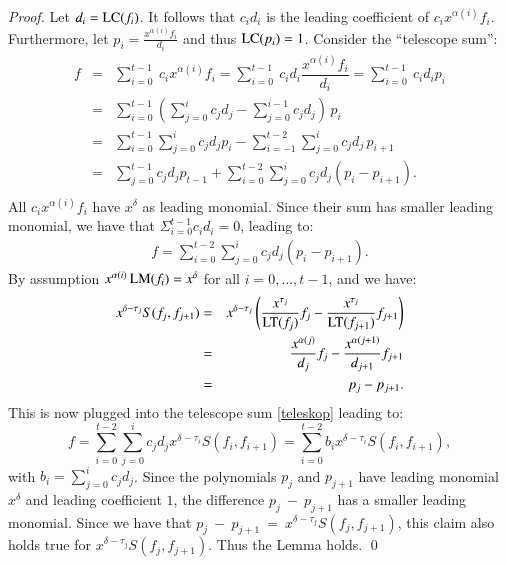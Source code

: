 \begin{proof}
Let $d_i = \textsc{LC}(f_i)$. It follows that $c_id_i$ is the leading coefficient of $c_ix^{\alpha(i)}f_i$.  Furthermore, let $p_i = \frac{x^{\alpha(i)}f_i}{d_i}$ and thus $\textsc{LC}(p_i) = 1$. Consider the ``telescope sum'':
\begin{eqnarray*}
f &=&\sum^{t-1}_{i=0} \ c_ix^{\alpha(i)}f_i=\sum^{t-1}_{i=0}\ c_i d_i\dfrac{x^{\alpha(i)}f_i}{d_i}=\sum^{t-1}_{i=0}\ c_id_ip_i\\
&=&\sum^{t-1}_{i=0}\left( \sum_{j=0}^{i}c_{j}d_{j} - \sum_{j=0}^{i-1}c_{j}d_{j} \right)\, p_{i}\\
&=&\sum^{t-1}_{i=0} \sum_{j=0}^{i}c_{j}d_{j}p_{i} -\sum^{t-2}_{i=-1} \sum_{j=0}^{i}c_{j}d_{j} \, p_{i+1}\\
&=&\sum_{j=0}^{t-1}c_{j}d_{j}p_{t-1}+\sum^{t-2}_{i=0} \sum_{j=0}^{i}c_{j}d_{j}(p_{i} - p_{i+1}).\\
\end{eqnarray*}
All $c_ix^{\alpha(i)}f_i$ have $x^\delta$ as leading monomial. Since their sum has smaller leading monomial, we have that 
$\Sigma^{t-1}_{i=0}c_id_i = 0$, leading to:
\begin{eqnarray} \label{teleskop}
f = \sum^{t-2}_{i=0} \sum_{j=0}^{i}c_{j}d_{j}(p_{i} - p_{i+1}).
\end{eqnarray}
By assumption  \(x^{\alpha(i)}\,\textsc{LM}(f_{i})=x^{\delta}\) for all \(i=0,\ldots,t-1\), and we have:
\begin{eqnarray*}
x^{\delta - \tau_{j}}S(f_j,f_{j+1}) &=& x^{\delta - \tau_{j}} \left(\dfrac{x^{\tau_{j}}}{\textsc{LT}(f_j)}f_j - \dfrac{x^{\tau_{j}}}{\textsc{LT}(f_{j+1})}f_{j+1}\right)\\
&=& \dfrac{x^{\alpha(j)}}{d_j}f_j - \dfrac{x^{\alpha(j+1)}}{d_{j+1}}f_{j+1}\\
&=& p_j - p_{j+1}.
\end{eqnarray*}
This is now plugged into the telescope sum \eqref{teleskop} leading to:
\[
f = \sum^{t-2}_{i=0} \sum_{j=0}^{i}c_{j}d_{j}x^{\delta - \tau_{i}}S(f_i,f_{i+1})
 = \sum^{t-2}_{i=0} b_{i}  x^{\delta - \tau_{i}}  S(f_{i},f_{i+1}),
\]
with \(b_{i}=\sum_{j=0}^{i}c_{j}d_{j}\).
Since the polynomials $p_j$ and $p_{j+1}$ have leading monomial $x^\delta$ and leading coefficient $1$, the difference $p_j\ -\ p_{j+1}$ has a smaller leading monomial. Since we have that $p_j\ -\ p_{j+1}\ =\  x^{\delta - \tau_{j}}S(f_j, f_{j+1})$, this claim also holds true for $x^{\delta - \tau_{j}}S(f_j,f_{j+1})$. Thus the Lemma holds. \qed
\end{proof}


